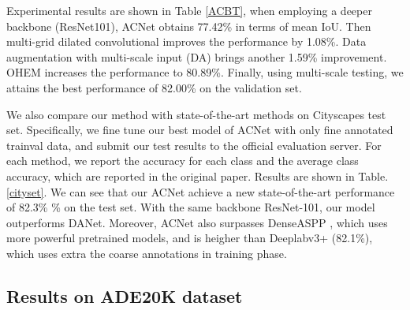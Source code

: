 \documentclass[10pt,twocolumn,letterpaper]{article}
\begin{document}
Experimental results are shown in Table \ref{ACBT}, when employing a deeper backbone (ResNet101), ACNet obtains  77.42\% in terms of mean IoU. Then multi-grid dilated convolutional improves the performance by 1.08\%. Data augmentation with multi-scale input (DA) brings another 1.59\% improvement. OHEM increases the performance to  80.89\%. Finally, using multi-scale testing, we attains the best performance of 82.00\% on the validation set. 


 We also compare our method with state-of-the-art methods on Cityscapes test set. Specifically, we fine tune our best model of ACNet
with only fine annotated trainval data, and submit our test results to the official
evaluation server.  For each method, we report the accuracy for each class and
the average class accuracy, which are reported in the original paper. Results are shown in Table. \ref{cityset}. We can see that our ACNet achieve a new state-of-the-art performance of 82.3\% \%  on the test set. 
With the same backbone ResNet-101, our model outperforms DANet\cite{fu2018dual}. Moreover, ACNet also surpasses DenseASPP \cite{yang2018denseaspp} , which uses more powerful pretrained models, and is heigher than Deeplabv3+ \cite{chen2018encoder} (82.1\%), which uses extra the coarse annotations in training phase.

\subsection{Results on ADE20K dataset}
\end{document}
